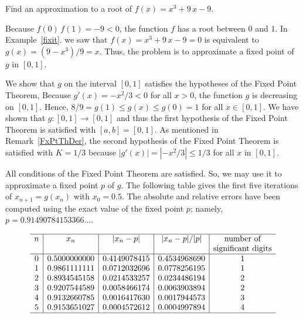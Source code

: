 \begin{egg}
Find an approximation to a root of $f(x)=x^3+9\,x-9$.

Because $f(0)\,f(1)=-9<0$, the function $f$ has a root between $0$ and
$1$.  In Example~\ref{fixit}. we saw that $f(x)=x^3+9\,x-9=0$ is
equivalent to $g(x)=(9-x^3)/9 =x$.  Thus, the problem is to
approximate a fixed point of $g$ in $[0,1]$.

We show that $g$ on the interval $[0,1]$ satisfies the hypotheses of
the Fixed Point Theorem,  Because $g'(x) = -x^2/3 < 0$ for all $x>0$,
the function $g$ is decreasing on $[0,1]$.  Hence,
$8/9 =g(1) \leq g(x) \leq g(0) = 1$ for all $x \in [0,1]$.  We have
shown that $g:[0,1]\rightarrow [0,1]$ and thus the first hypothesis of
the Fixed Point Theorem is satisfied with $[a,b]=[0,1]$.  As mentioned
in Remark~\ref{FxPtThDer}, the second hypothesis of the Fixed Point
Theorem is satisfied with $K=1/3$ because $|g'(x)|=|-x^2/3|\leq1/3$ for
all $x$ in $[0,1]$.

All conditions of the Fixed Point Theorem are satisfied.  So, we
may use it to approximate a fixed point $p$ of $g$.  The following table
gives the first five iterations of $x_{n+1} = g(x_n)$ with
$x_0=0.5$.  The absolute and relative errors have been computed using
the exact value of the fixed point $p$; namely,
$p=0.91490784153366\ldots$.

\[
\begin{array}{c|c|c|c|c}
\hline
n & x_n & |x_n-p| & |x_n-p|/|p| & \text{number of} \\
 & & & & \text{significant digits} \\
\hline
0 & 0.5000000000 & 0.4149078415 & 0.4534968690 & 1 \\
1 & 0.9861111111 & 0.0712032696 & 0.0778256195 & 1 \\
2 & 0.8934545158 & 0.0214533257 & 0.0234486194 & 2 \\
3 & 0.9207544589 & 0.0058466174 & 0.0063903894 & 2 \\
4 & 0.9132660785 & 0.0016417630 & 0.0017944573 & 3 \\
5 & 0.9153651027 & 0.0004572612 & 0.0004997894 & 4 \\
\hline
\end{array}
\]
\end{egg}

